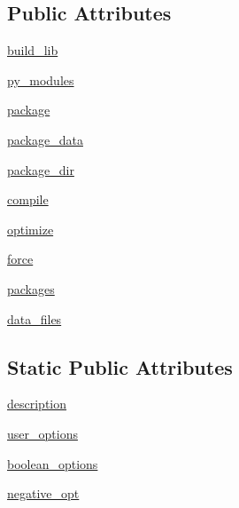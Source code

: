 \subsection*{Public Attributes}
\begin{DoxyCompactItemize}
\item 
\hyperlink{classsetuptools_1_1__distutils_1_1command_1_1build__py_1_1build__py_aac36f88a5d61ee5d72ab0fcc6f01a600}{build\+\_\+lib}
\item 
\hyperlink{classsetuptools_1_1__distutils_1_1command_1_1build__py_1_1build__py_af3a844e2c80f0d3d8b4daf57a2183201}{py\+\_\+modules}
\item 
\hyperlink{classsetuptools_1_1__distutils_1_1command_1_1build__py_1_1build__py_a9166969e65bc8431af32d65df47d6905}{package}
\item 
\hyperlink{classsetuptools_1_1__distutils_1_1command_1_1build__py_1_1build__py_ad06443542482750f89ccc141b66df061}{package\+\_\+data}
\item 
\hyperlink{classsetuptools_1_1__distutils_1_1command_1_1build__py_1_1build__py_ad5e418ba1d8aff7a25bf892ca801c3fa}{package\+\_\+dir}
\item 
\hyperlink{classsetuptools_1_1__distutils_1_1command_1_1build__py_1_1build__py_af7977fc5f9cc86d12f3b8f5bde943712}{compile}
\item 
\hyperlink{classsetuptools_1_1__distutils_1_1command_1_1build__py_1_1build__py_a22045e14aebeb655b13519f0b0693e6c}{optimize}
\item 
\hyperlink{classsetuptools_1_1__distutils_1_1command_1_1build__py_1_1build__py_a69d62c215d7df7858fc0b33ec862ab30}{force}
\item 
\hyperlink{classsetuptools_1_1__distutils_1_1command_1_1build__py_1_1build__py_a60c54cdaabeba7cad7dd7edda1deb32a}{packages}
\item 
\hyperlink{classsetuptools_1_1__distutils_1_1command_1_1build__py_1_1build__py_a16bedc5743c9175eed9bc418b26c0f5f}{data\+\_\+files}
\end{DoxyCompactItemize}
\subsection*{Static Public Attributes}
\begin{DoxyCompactItemize}
\item 
\hyperlink{classsetuptools_1_1__distutils_1_1command_1_1build__py_1_1build__py_aa6ad1f930a6348a1a60841e35e1eb29d}{description}
\item 
\hyperlink{classsetuptools_1_1__distutils_1_1command_1_1build__py_1_1build__py_adde0a93682fdd2b6f2faa2e491bb4f8d}{user\+\_\+options}
\item 
\hyperlink{classsetuptools_1_1__distutils_1_1command_1_1build__py_1_1build__py_ae1c96c111f538de7715b02a5b9aaa8a6}{boolean\+\_\+options}
\item 
\hyperlink{classsetuptools_1_1__distutils_1_1command_1_1build__py_1_1build__py_ae9876feae5ffe6127c553c9a0ed88e3a}{negative\+\_\+opt}
\end{DoxyCompactItemize}


